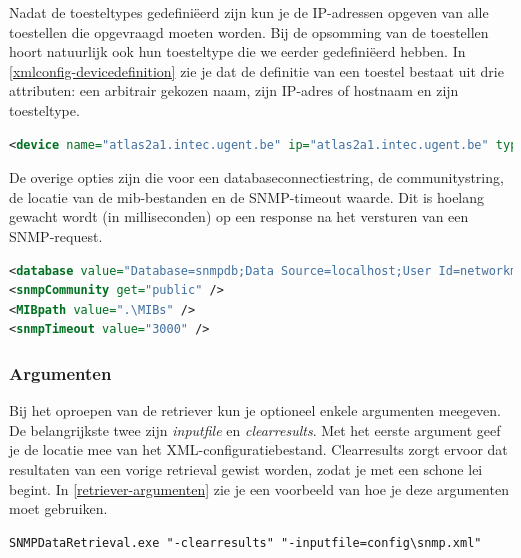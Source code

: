 Nadat de toesteltypes gedefiniëerd zijn kun je de IP-adressen opgeven van alle toestellen die opgevraagd moeten worden.
Bij de opsomming van de toestellen hoort natuurlijk ook hun toesteltype die we eerder gedefiniëerd hebben.
In \cref{xmlconfig-devicedefinition} zie je dat de definitie van een toestel bestaat uit drie attributen: een arbitrair gekozen naam, zijn IP-adres of hostnaam en zijn toesteltype. 

\begin{lstlisting}[language=XML, float=h, caption={Definitie van een toestel in het XML-configuratiebestand}, label=xmlconfig-devicedefinition]
<device name="atlas2a1.intec.ugent.be" ip="atlas2a1.intec.ugent.be" type="Bridge" />
\end{lstlisting}

De overige opties zijn die voor een databaseconnectiestring, de communitystring, de locatie van de \gls{mib}-bestanden en de SNMP-timeout waarde.
Dit is hoelang gewacht wordt (in milliseconden) op een response na het versturen van een SNMP-request.

\begin{lstlisting}[language=XML, float=h, caption={Overige opties in het XML-configuratiebestand}, label=xmlconfig-misc]
<database value="Database=snmpdb;Data Source=localhost;User Id=networkminer;Password=SomePassword;Port=3306;old syntax=yes" />
<snmpCommunity get="public" />
<MIBpath value=".\MIBs" />
<snmpTimeout value="3000" />
\end{lstlisting}


\subsubsection{Argumenten}
Bij het oproepen van de retriever kun je optioneel enkele argumenten meegeven.
De belangrijkste twee zijn \emph{inputfile} en \emph{clearresults}.
Met het eerste argument geef je de locatie mee van het XML-configuratiebestand.
Clearresults zorgt ervoor dat resultaten van een vorige retrieval gewist worden, zodat je met een schone lei begint.
In \cref{retriever-argumenten} zie je een voorbeeld van hoe je deze argumenten moet gebruiken.

\begin{lstlisting}[float=h, caption={Oproepen van SNMP Data Retriever met twee argumenten}, label=retriever-argumenten]
SNMPDataRetrieval.exe "-clearresults" "-inputfile=config\snmp.xml"
\end{lstlisting}



